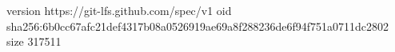 version https://git-lfs.github.com/spec/v1
oid sha256:6b0cc67afc21def4317b08a0526919ae69a8f288236de6f94f751a0711dc2802
size 317511
